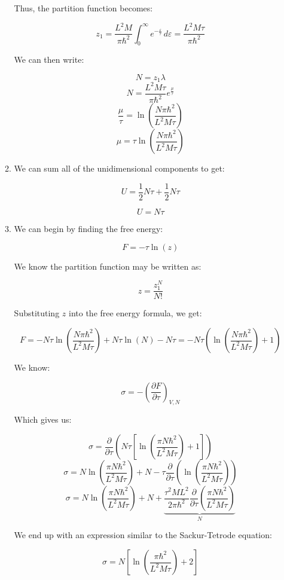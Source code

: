 \begin{enumerate}
\begin{enumerate}
        Thus, the partition function becomes:

        $$z_1=\frac{L^2M}{\pi\hbar^2}\int_0^\infty e^{-\frac{\varepsilon}{\tau}}\,d\varepsilon=\frac{L^2M\tau}{\pi\hbar^2}$$

        We can then write:

        $$N=z_1\lambda$$
        $$N=\frac{L^2M\tau}{\pi\hbar^2}e^{\frac{\mu}{\tau}}$$
        $$\frac{\mu}{\tau}=\ln\left( \frac{N\pi\hbar^2}{L^2M\tau} \right)$$
        $$\boxed{\mu=\tau\ln\left( \frac{N\pi\hbar^2}{L^2M\tau} \right)}$$

      \item 

        We can sum all of the unidimensional components to get:

        $$U=\frac{1}{2}N\tau+\frac{1}{2}N\tau$$

        $$\boxed{U=N\tau}$$

      \item 

        We can begin by finding the free energy:

        $$F=-\tau\ln(z)$$

        We know the partition function may be written as:

        $$z=\frac{z_1^N}{N!}$$

        Substituting $z$ into the free energy formula, we get:

        $$F=-N\tau\ln\left( \frac{N\pi \hbar^2}{L^2M\tau}\right)+N\tau\ln(N)-N\tau=-N\tau\left(\ln\left( \frac{N\pi \hbar^2}{L^2M\tau}\right)+1\right)$$

        We know:

        $$\sigma=-\left( \frac{\partial F}{\partial \tau} \right)_{V,N}$$

        Which gives us:

        $$\sigma=\frac{\partial}{\partial\tau}\left( N\tau\left[\ln\left( \frac{\pi N\hbar^2}{L^2M\tau} \right) +1\right]\right)$$
        $$\sigma=N\ln\left( \frac{\pi N\hbar^2}{L^2M\tau} \right)+N-\tau\frac{\partial}{\partial\tau}\left( \ln\left( \frac{\pi N\hbar^2}{L^2M\tau} \right) \right)$$
        $$\sigma=N\ln\left( \frac{\pi N\hbar^2}{L^2M\tau} \right)+N+\underbrace{\frac{\tau^2ML^2}{2\pi \hbar^2}\frac{\partial}{\partial\tau}\left( \frac{\pi N\hbar^2}{L^2M\tau} \right)}_{N}$$

        We end up with an expression similar to the Sackur-Tetrode equation:

        $$\boxed{\sigma=N\left[\ln\left( \frac{\pi\hbar^2}{L^2M\tau} \right)+2\right]}$$


\end{enumerate}
\end{enumerate}
